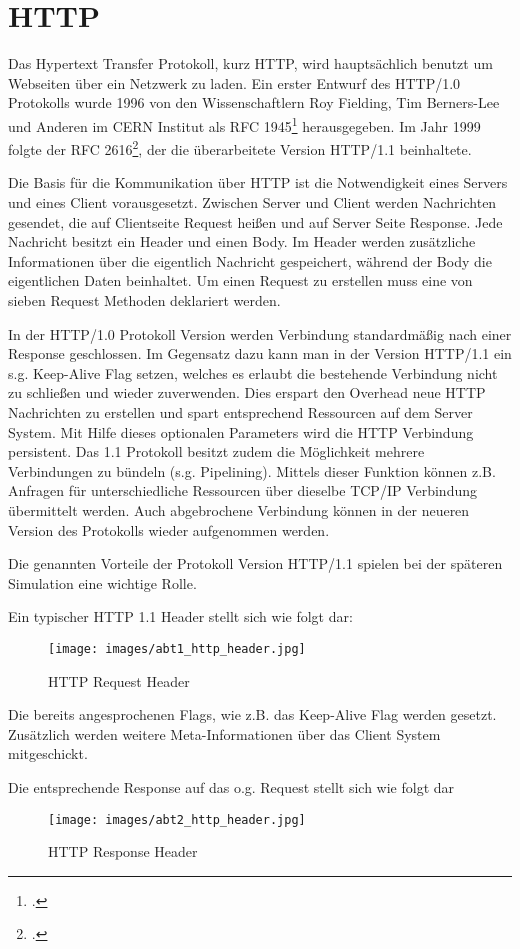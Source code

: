 \section{HTTP}
Das Hypertext Transfer Protokoll, kurz HTTP, wird hauptsächlich benutzt um Webseiten über ein Netzwerk zu laden. Ein erster Entwurf des HTTP/1.0 Protokolls wurde 1996 von den Wissenschaftlern
Roy Fielding, Tim Berners-Lee und Anderen im CERN Institut als RFC 1945\footcite{BERNERS-LEE:RFC1945:Online} herausgegeben. Im Jahr 1999 folgte der RFC 2616\footcite{FIELDING:RFC2616:Online}, der die überarbeitete Version HTTP/1.1 beinhaltete.


Die Basis für die Kommunikation über HTTP ist die Notwendigkeit eines Servers und eines Client vorausgesetzt. Zwischen Server und Client werden
Nachrichten gesendet, die auf Clientseite Request heißen und auf Server Seite Response. Jede Nachricht besitzt ein Header und einen Body. Im Header
werden zusätzliche Informationen über die eigentlich Nachricht gespeichert, während der Body die eigentlichen Daten beinhaltet. Um einen Request zu erstellen muss eine von sieben
Request Methoden deklariert werden. 



In der HTTP/1.0 Protokoll Version werden Verbindung standardmäßig nach einer Response geschlossen. Im Gegensatz dazu kann man in der Version HTTP/1.1
ein s.g. Keep-Alive Flag setzen, welches es erlaubt die bestehende Verbindung nicht zu schließen und wieder zuverwenden. Dies erspart den Overhead
neue HTTP Nachrichten zu erstellen und spart entsprechend Ressourcen auf dem Server System. Mit Hilfe dieses optionalen Parameters wird die HTTP Verbindung
persistent. Das 1.1 Protokoll besitzt zudem die Möglichkeit mehrere Verbindungen zu bündeln (s.g. Pipelining). Mittels dieser Funktion
können z.B. Anfragen für unterschiedliche Ressourcen über dieselbe TCP/IP Verbindung übermittelt werden. Auch abgebrochene Verbindung können
in der neueren Version des Protokolls wieder aufgenommen werden. 

Die genannten Vorteile der Protokoll Version HTTP/1.1 spielen bei der späteren Simulation eine wichtige Rolle.

Ein typischer HTTP 1.1 Header stellt sich wie folgt dar:

\begin{figure}[h]
\centering
\texttt{[image: images/abt1\_http\_header.jpg]}
\caption{HTTP Request Header}
\end{figure}

Die bereits angesprochenen Flags, wie z.B. das Keep-Alive Flag werden gesetzt. Zusätzlich werden weitere Meta-Informationen über das Client System mitgeschickt. 

Die entsprechende Response auf das o.g. Request stellt sich wie folgt dar

\begin{figure}[h]
\centering
\texttt{[image: images/abt2\_http\_header.jpg]}
\caption{HTTP Response Header}
\end{figure}
